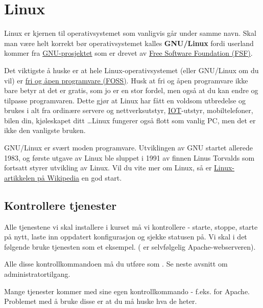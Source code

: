 \chapter{Linux} %

Linux er kjernen til operativsystemet som vanligvis går under samme navn. Skal man være
helt korrekt bør operativsystemet kalles \textbf{GNU/Linux} 
fordi userland kommer fra \href{https://www.gnu.org/}{GNU-prosjektet}
som er drevet av \href{https://www.fsf.org/}{Free Software Foundation (FSF)}.

Det viktigste å huske er at hele Linux-operativsystemet (eller GNU/Linux om du vil) er 
\href{https://en.wikipedia.org/wiki/Free_and_open-source_software}{fri og åpen programvare (FOSS)}.
Husk at fri og åpen programvare ikke bare betyr at det er gratis, som jo er en stor fordel, men 
også at du kan endre og tilpasse programvaren. Dette gjør at Linux har fått en voldsom utbredelse
og brukes i alt fra ordinære servere og nettverksutstyr, 
\href{https://en.wikipedia.org/wiki/Internet_of_things}{IOT}-utstyr, mobiltelefoner, bilen din, 
kjøleskapet ditt \dots Linux fungerer også flott som vanlig PC, men det er ikke den vanligste 
bruken.

GNU/Linux er svært moden programvare. Utviklingen av GNU startet allerede 1983, og første utgave 
av Linux ble sluppet i 1991 av finnen Linus Torvalds som fortsatt styrer utvikling av Linux.
Vil du vite mer om Linux, så er 
\href{https://en.wikipedia.org/wiki/Linux}{Linux-artikkelen på Wikipedia} \cite{wiki:linux}
en god start.

\section{Kontrollere tjenester}

Alle tjenestene vi skal installere i kurset må vi kontrollere - starte, stoppe, starte på nytt,
laste inn oppdatert konfigurasjon og sjekke statusen på. Vi skal i det følgende bruke 
tjenesten  som et eksempel. ( er selvfølgelig Apache-webserveren).

\begin{remark}
Alle disse kontrollkommandoen må du utføre som . 
Se neste avsnitt om administratortilgang.
\end{remark}

Mange tjenester kommer med sine egen kontrollkommando - f.eks.  for Apache.
Problemet med å bruke disse er at du må huske hva de heter.

